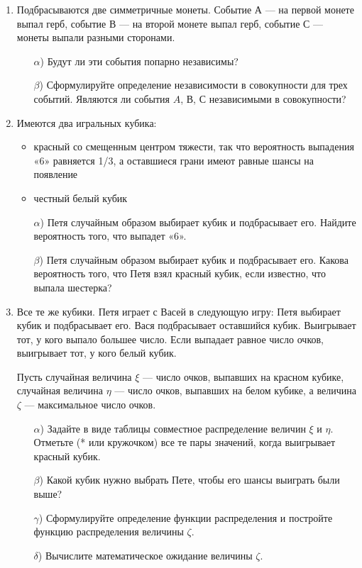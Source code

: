 \documentclass[12pt, a4paper]{article}\usepackage[]{graphicx}\usepackage[]{color}
\begin{document}
				\begin{enumerate}
					\item
					Подбрасываются две симметричные монеты. Событие А — на первой монете выпал
					герб, событие В — на второй монете выпал герб, событие С — монеты выпали
					разными сторонами.
					\begin{enumerate}
						\item[$\alpha$)] Будут ли эти события попарно независимы?
						\item[$\beta$)]  Сформулируйте определение независимости в совокупности для трех событий. Являются ли события $A$, $В$, $С$ независимыми в совокупности?
					\end{enumerate}

					\item
					Имеются два игральных кубика:
					\begin{itemize}
						\item красный со смещенным центром тяжести, так что вероятность выпадения «6»
						равняется 1/3, а оставшиеся грани имеют равные шансы на появление
						\item честный белый кубик
					\end{itemize}

					\begin{enumerate}
						\item[$\alpha$)] Петя случайным образом выбирает кубик и подбрасывает его. Найдите
						вероятность того, что выпадет «6».
						\item[$\beta$)]   Петя случайным образом выбирает кубик и подбрасывает его. Какова
						вероятность того, что Петя взял красный кубик, если известно, что выпала
						шестерка?
					\end{enumerate}

					\item
					Все те же кубики. Петя играет с Васей в следующую игру: Петя выбирает кубик и
					подбрасывает его. Вася подбрасывает оставшийся кубик. Выигрывает тот, у кого
					выпало большее число. Если выпадает равное число очков, выигрывает тот, у кого
					белый кубик.

					Пусть случайная величина $\xi$ — число очков, выпавших на красном кубике, случайная величина $\eta$ — число очков,
					выпавших на белом кубике, а величина $\zeta$ — максимальное число очков.

					\begin{enumerate}
						\item[$\alpha$)] Задайте в виде таблицы совместное распределение величин $\xi$ и $\eta$. Отметьте (* или кружочком) все те пары значений, когда выигрывает красный кубик.
						\item[$\beta$)] Какой кубик нужно выбрать Пете, чтобы его шансы выиграть были выше?
						\item[$\gamma$)] Сформулируйте определение функции распределения и постройте функцию
						распределения величины $\zeta$.
						\item[$\delta$)] Вычислите математическое ожидание величины $\zeta$.
					\end{enumerate}


\end{enumerate}
\end{document}
